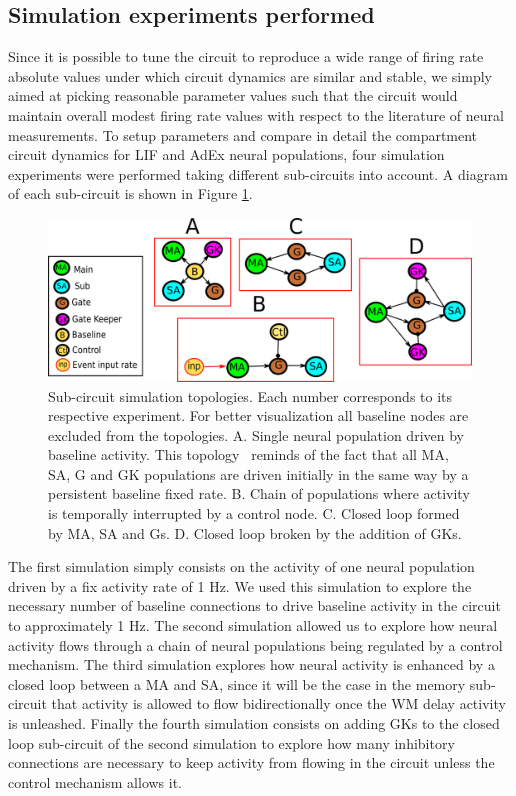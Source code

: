 \documentclass[10pt]{article}
\begin{document}
\subsection{Simulation experiments performed}\label{simulation-experiments-performed}

Since it is possible to tune the circuit to reproduce a wide range of firing rate absolute values under which circuit dynamics are similar and stable, we simply aimed at picking reasonable parameter values such that the circuit would maintain overall modest firing rate values with respect to the literature of neural measurements.
To setup parameters and compare in detail the compartment circuit dynamics for LIF and AdEx neural populations, four simulation experiments were performed taking different sub-circuits into account.
A diagram of each sub-circuit is shown in Figure \ref{sub_circuits}.

\begin{figure}[h!]
  \begin{center}
    \includegraphics[width=0.70\columnwidth]{figures/sub_circuits3/sub_circuits3}
    \caption{Sub-circuit simulation topologies.
      Each number corresponds to its respective experiment.
      For better visualization all baseline nodes are excluded from the topologies.
      A. Single neural population driven by baseline activity.
      This topology~ reminds of the fact that all MA, SA, G and GK populations are driven initially in the same way by a persistent baseline fixed rate.
      B. Chain of populations where activity is temporally interrupted by a control node.
      C. Closed loop formed by MA, SA and Gs.
      D. Closed loop broken by the addition of GKs. {\label{sub_circuits}}%
    }
  \end{center}
\end{figure}

The first simulation simply consists on the activity of one neural population driven by a fix activity rate of 1 Hz.
We used this simulation to explore the necessary number of baseline connections to drive baseline activity in the circuit to approximately 1 Hz.
The second simulation allowed us to explore how neural activity flows through a chain of neural populations being regulated by a control mechanism.
The third simulation explores how neural activity is enhanced by a closed loop between a MA and SA, since it will be the case in the memory sub-circuit that activity is allowed to flow bidirectionally once the WM delay activity is unleashed.
Finally the fourth simulation consists on adding GKs to the closed loop sub-circuit of the second simulation to explore how many inhibitory connections are necessary to keep activity from flowing in the circuit unless the control mechanism allows it.
\end{document}
